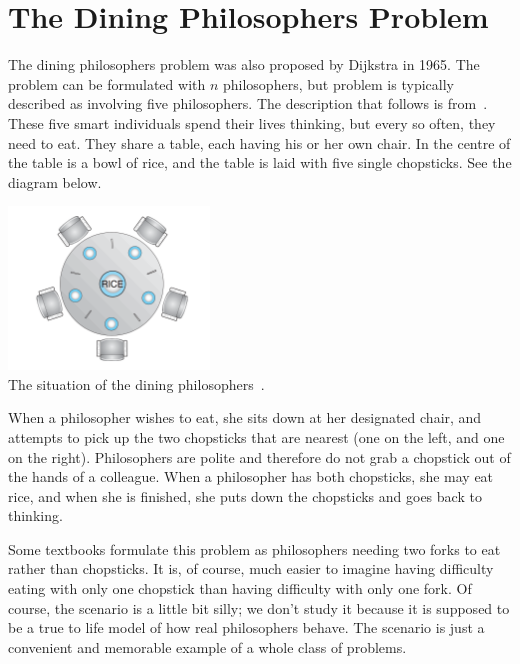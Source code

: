 




\section*{The Dining Philosophers Problem}

The dining philosophers problem was also proposed by Dijkstra in 1965. The problem can be formulated with $n$ philosophers, but problem is typically described as involving five philosophers. The description that follows is from~\cite{osc}. These five smart individuals spend their lives thinking, but every so often, they need to eat. They share a table, each having his or her own chair. In the centre of the table is a bowl of rice, and the table is laid with five single chopsticks. See the diagram below.

\begin{center}
	\includegraphics[width=0.4\textwidth]{images/philosopher-table.png}\\
	The situation of the dining philosophers~\cite{osc}.
\end{center}

When a philosopher wishes to eat, she sits down at her designated chair, and attempts to pick up the two chopsticks that are nearest (one on the left, and one on the right). Philosophers are polite and therefore do not grab a chopstick out of the hands of a colleague. When a philosopher has both chopsticks, she may eat rice, and when she is finished, she puts down the chopsticks and goes back to thinking.

Some textbooks formulate this problem as philosophers needing two forks to eat rather than chopsticks. It is, of course, much easier to imagine having difficulty eating with only one chopstick than having difficulty with only one fork. Of course, the scenario is a little bit silly; we don't study it because it is supposed to be a true to life model of how real philosophers behave. The scenario is just a convenient and memorable example of a whole class of problems.


